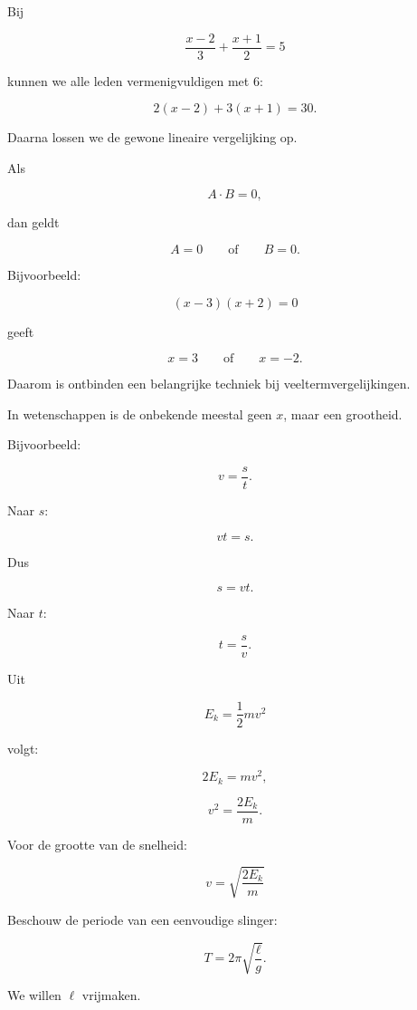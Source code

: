 \documentclass{ximera}
\begin{document}

Bij

\[
\frac{x-2}{3}+\frac{x+1}{2}=5
\]

kunnen we alle leden vermenigvuldigen met \(6\):

\[
2(x-2)+3(x+1)=30.
\]

Daarna lossen we de gewone lineaire vergelijking op.



Als

\[
A\cdot B=0,
\]

dan geldt

\[
A=0
\qquad\text{of}\qquad
B=0.
\]

Bijvoorbeeld:

\[
(x-3)(x+2)=0
\]

geeft

\[
x=3
\qquad\text{of}\qquad
x=-2.
\]

Daarom is ontbinden een belangrijke techniek bij veeltermvergelijkingen.



In wetenschappen is de onbekende meestal geen \(x\), maar een grootheid.

Bijvoorbeeld:

\[
v=\frac st.
\]

Naar \(s\):

\[
vt=s.
\]

Dus

\[
\boxed{s=vt}.
\]

Naar \(t\):

\[
\boxed{t=\frac sv}.
\]


\begin{voorbeeld}
Uit

\[
E_k=\frac12mv^2
\]

volgt:

\[
2E_k=mv^2,
\]

\[
v^2=\frac{2E_k}{m}.
\]

Voor de grootte van de snelheid:

\[
\boxed{
v=\sqrt{\frac{2E_k}{m}}
}
\]
\end{voorbeeld}



Beschouw de periode van een eenvoudige slinger:

\[
T=2\pi\sqrt{\frac{\ell}{g}}.
\]

We willen \(\ell\) vrijmaken.
\end{document}
